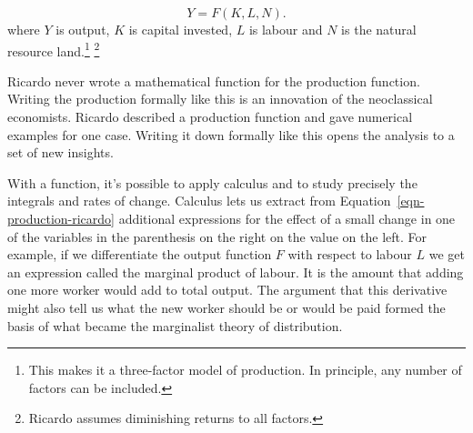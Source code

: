 \begin{equation} 
Y=F(K,L,N).
\label{eqn-production-ricardo}
\end{equation} 
where $Y$ is output, $K$ is capital invested, $L$ is labour and $N$ is the natural resource land.\footnote{This makes it a three-factor model of production.  In principle, any number of factors can be included.}  \footnote{Ricardo assumes diminishing returns to all factors.} 

Ricardo never wrote a mathematical function for the production function. Writing the production formally like this is an innovation of the neoclassical economists. Ricardo described a production function and gave numerical examples for one case. Writing it down formally like this opens the analysis to a set of new insights. 

With a function, it's possible to apply calculus and to study precisely the integrals and rates of change. 
Calculus lets us extract from Equation~\ref{eqn-production-ricardo} additional expressions for the effect of a small change in one of the variables in the parenthesis on the right on the value on the left.  For example, if we differentiate the output function $F$ with respect to labour $L$ we get an expression called the \gls{marginal product} of labour. It is the amount that adding one more worker would add to total output. 
The argument that this derivative might also tell us what the new worker should be or would be paid %
formed the basis of what became the \gls{marginalist} theory of distribution. %


